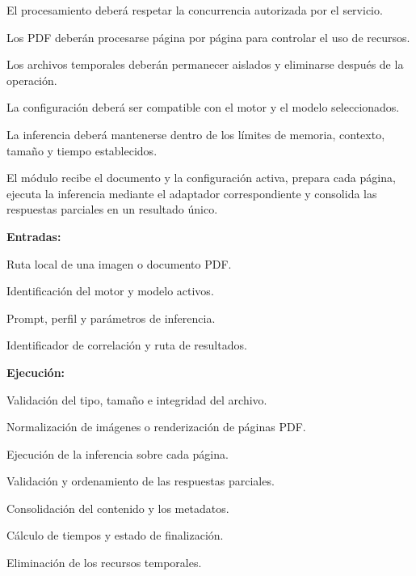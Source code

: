 \begin{definicionmodulo}
\item[Restricciones]
\begin{elementosmodulo}
    \item El procesamiento deberá respetar la concurrencia autorizada por el servicio.
    \item Los PDF deberán procesarse página por página para controlar el uso de recursos.
    \item Los archivos temporales deberán permanecer aislados y eliminarse después de la operación.
    \item La configuración deberá ser compatible con el motor y el modelo seleccionados.
    \item La inferencia deberá mantenerse dentro de los límites de memoria, contexto, tamaño y tiempo establecidos.
\end{elementosmodulo}

\item[Estructura general] El módulo recibe el documento y la configuración activa, prepara cada página, ejecuta la inferencia mediante el adaptador correspondiente y consolida las respuestas parciales en un resultado único.

\textbf{Entradas:}
\begin{elementosmodulo}
    \item Ruta local de una imagen o documento PDF.
    \item Identificación del motor y modelo activos.
    \item Prompt, perfil y parámetros de inferencia.
    \item Identificador de correlación y ruta de resultados.
\end{elementosmodulo}

\textbf{Ejecución:}
\begin{elementosmodulo}
    \item Validación del tipo, tamaño e integridad del archivo.
    \item Normalización de imágenes o renderización de páginas PDF.
    \item Ejecución de la inferencia sobre cada página.
    \item Validación y ordenamiento de las respuestas parciales.
    \item Consolidación del contenido y los metadatos.
    \item Cálculo de tiempos y estado de finalización.
    \item Eliminación de los recursos temporales.
\end{elementosmodulo}


\end{definicionmodulo}
